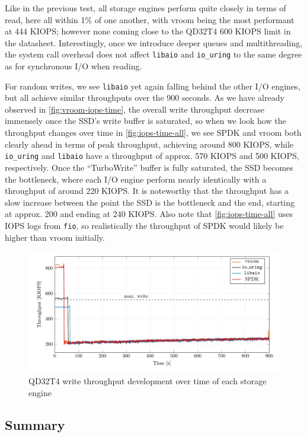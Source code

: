 Like in the previous test, all storage engines perform quite closely in terms of read, here all within 1\% of one another, with vroom being the most performant at 444 KIOPS; however none coming close to the QD32T4 600 KIOPS limit in the datasheet. Interestingly, once we introduce deeper queues and multithreading, the system call overhead does not affect \texttt{libaio} and \texttt{io\_uring} to the same degree as for synchronous I/O when reading.

For random writes, we see \texttt{libaio} yet again falling behind the other I/O engines, but all achieve similar throughputs over the 900 seconds. As we have already observed in \autoref{fig:vroom-iops-time}, the overall write throughput decrease immensely once the SSD's write buffer is saturated, so when we look how the throughput changes over time in \autoref{fig:iops-time-all}, we see SPDK and vroom both clearly ahead in terms of peak throughput, achieving around 800 KIOPS, while \texttt{io\_uring} and \texttt{libaio} have a throughput of approx. 570 KIOPS and 500 KIOPS, respectively. Once the ``TurboWrite'' buffer is fully saturated, the SSD becomes the bottleneck, where each I/O engine perform nearly identically with a throughput of around 220 KIOPS. It is noteworthy that the throughput has a slow increase between the point the SSD is the bottleneck and the end, starting at approx. 200 and ending at 240 KIOPS. Also note that \autoref{fig:iops-time-all} uses IOPS logs from \texttt{fio}, so realistically the throughput of SPDK would likely be higher than vroom initially.

\begin{figure}
  \centering
    \includegraphics[width=\textwidth]{figures/iops-time-tmp}
    \caption{QD32T4 write throughput development over time of each storage engine}
    \label{fig:iops-time-all}
\end{figure}


\subsection{Summary}
